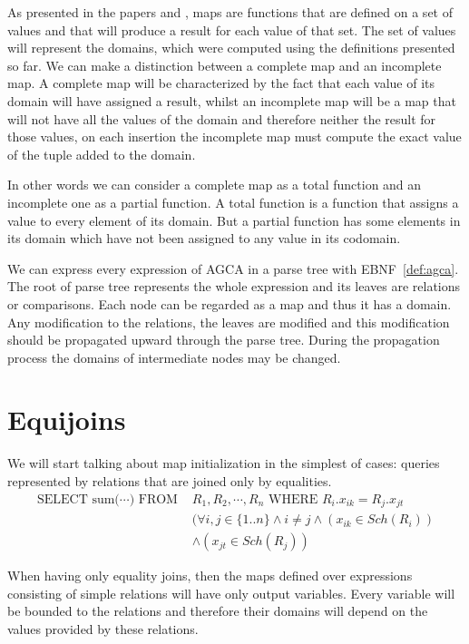 \documentclass[12pt]{article}
\begin{document}
As presented in the papers \cite{1} and \cite{2}, maps are functions that are defined on a set of values and that will produce a result for each value of that set. The set of values will represent the domains, which were computed using the definitions presented so far. We can make a distinction between a complete map and an incomplete map. A complete map will be characterized by the fact that each value of its domain will have assigned a result, whilst an incomplete map will be a map that will not have all the values of the domain and therefore neither the result for those values, on each insertion the incomplete map must compute the exact value of the tuple added to the domain.

In other words we can consider a complete map as a total function and an incomplete one as a partial function. A total function is a function that assigns a value to every element of its domain. But a partial function has some elements in its domain which have not been assigned to any value in its codomain. \par

We can express every expression of AGCA in a parse tree with EBNF~\ref{def:agca}. The root of parse tree represents the whole expression and its leaves are relations or comparisons. Each node can be regarded as a map and thus it has a domain. Any modification to the relations, the leaves are modified and this modification should be propagated upward through the parse tree. During the propagation process the domains of intermediate nodes may be changed. 

\section{Equijoins}

We will start talking about map initialization in the simplest of cases: queries represented by relations that are joined only by equalities.
\begin{align}
\mbox{SELECT sum(}\cdots\mbox{) FROM }&R_1,R_2,\cdots,R_n\mbox{ WHERE }R_i.x_{ik}=R_j.x_{jt} \label{query1}\\
&(\forall i,j\in\{1..n\}\land i\not=j\land (x_{ik}\in Sch(R_i))\nonumber\\
&\land(x_{jt}\in Sch(R_j))\nonumber
\end{align}

When having only equality joins, then the maps defined over expressions consisting of simple relations will have only output variables. Every variable will be bounded to the relations and therefore their domains will depend on the values provided by these relations.
\end{document}
